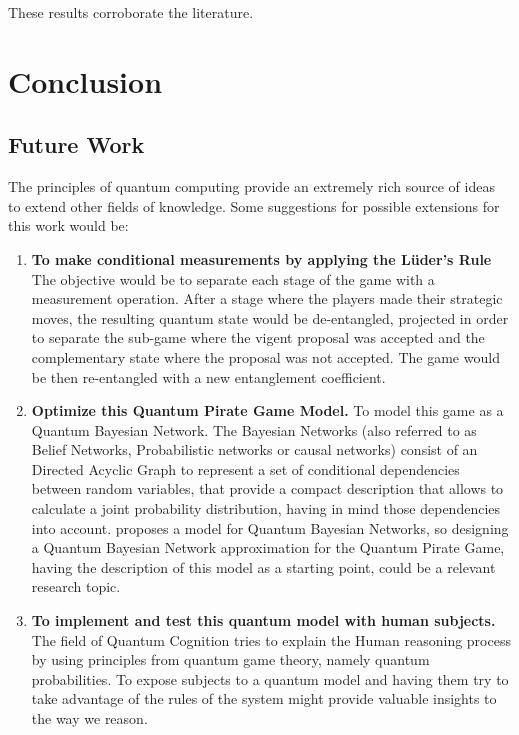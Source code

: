 \documentclass[10pt,twocolumn]{llncs}
\begin{document}
These results corroborate the literature.

\section{Conclusion}


\subsection{Future Work}
The principles of quantum computing provide an extremely rich source of ideas to extend other fields of knowledge.
Some suggestions for possible extensions for this work would be:

\begin{enumerate}

\item \textbf{To make conditional measurements by applying the L\"{u}der's Rule} The objective would be to separate each stage of the game with a measurement operation. After a stage where the players made their strategic moves, the resulting quantum state would be de-entangled, projected in order to separate  the sub-game where the vigent proposal was accepted and the complementary state where the proposal was not accepted. The game would be then re-entangled with a new entanglement coefficient. 

\item \textbf{Optimize this Quantum Pirate Game Model.} To model this game as a Quantum Bayesian Network. The Bayesian Networks (also referred to as Belief Networks, Probabilistic networks or causal networks) consist of an Directed Acyclic Graph to represent a set of conditional dependencies between random variables, that provide a compact description that allows to calculate a joint probability distribution, having in mind those dependencies into account. \cite{Tucci2012} proposes a model for Quantum Bayesian Networks, so designing a Quantum Bayesian Network approximation for the Quantum Pirate Game, having the description of this model as a starting point, could be a relevant research topic.

\item \textbf{To implement and test this quantum model with human subjects.} The field of Quantum Cognition tries to explain the Human reasoning process by using principles from quantum game theory, namely quantum probabilities. To expose subjects to a quantum model and having them try to take advantage of the rules of the system might provide valuable insights to the way we reason. 


\end{enumerate}
\end{document}
